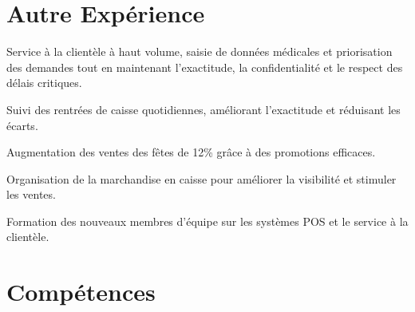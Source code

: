 \documentclass[letterpaper,10pt]{article}
\begin{document}
\newpage

\section{Autre Expérience}

\begin{resume_list}
\item Service à la clientèle à haut volume, saisie de données médicales et priorisation des demandes tout en maintenant l'exactitude, la confidentialité et le respect des délais critiques.
\end{resume_list}

\begin{resume_list}
\item Suivi des rentrées de caisse quotidiennes, améliorant l'exactitude et réduisant les écarts.
\item Augmentation des ventes des fêtes de 12\% grâce à des promotions efficaces.
\item Organisation de la marchandise en caisse pour améliorer la visibilité et stimuler les ventes.
\item Formation des nouveaux membres d'équipe sur les systèmes POS et le service à la clientèle.
\end{resume_list}

\section{Compétences}

\begin{skill_list}
\end{skill_list}
\end{document}
